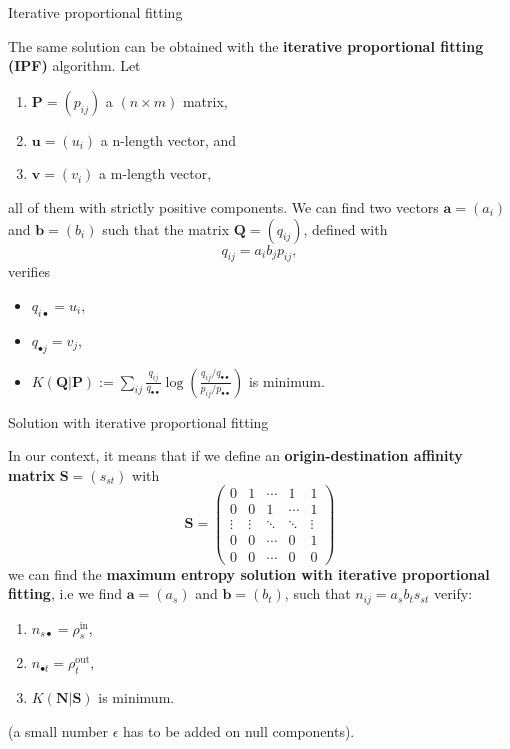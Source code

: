 \documentclass[10pt]{beamer}
\newcommand{\imp}[1]{\textbf{\color{cyan}#1}}
\begin{document}
	
	\begin{frame}{Iterative proportional fitting}
	
	The same solution can be obtained with the \imp{iterative proportional fitting (IPF)} algorithm. Let 
	\begin{enumerate}
		\item $\mathbf{P} = (p_{ij})$ a $(n \times m)$ matrix, 
		\item $\mathbf{u} = (u_i)$ a n-length vector, and 
		\item $\mathbf{v} = (v_i)$ a m-length vector,
	\end{enumerate}
	all of them with strictly positive components. We can find two vectors $\mathbf{a} = (a_i)$ and $\mathbf{b} = (b_i)$ such that the matrix $\mathbf{Q} = (q_{ij})$, defined with
	$$
		q_{ij} = a_i b_j p_{ij},
	$$
	verifies
	\begin{itemize}
		\item $q_{i\bullet} = u_i$,
		\item $q_{\bullet j} = v_j$,
		\item $K(\mathbf{Q}| \mathbf{P}) := \sum_{ij} \frac{q_{ij}}{q_{\bullet \bullet}} \log \left( \frac{q_{ij} / q_{\bullet \bullet}}{p_{ij} / p_{\bullet \bullet}} \right)$ is minimum.
	\end{itemize}
	\end{frame}
	
	
	\begin{frame}{Solution with iterative proportional fitting}
		
		In our context, it means that if we define an \imp{origin-destination affinity matrix} $\mathbf{S} = (s_{st})$ with 
			$$
				\mathbf{S} = \left( \begin{array}{ccccc}
				0 & 1 & \cdots & 1 & 1 \\
				0 & 0 & 1 & \cdots & 1 \\
				\vdots & \vdots & \ddots & \ddots & \vdots \\
				0 & 0 & \cdots & 0 & 1 \\
				0 & 0 & \cdots & 0 & 0 
				\end{array} \right)
			$$
		we can find the \imp{maximum entropy solution with iterative proportional fitting}, i.e we find $\mathbf{a} = (a_s)$ and $\mathbf{b} = (b_t)$, such that $n_{ij} = a_s b_t s_{st}$ verify:
		\begin{enumerate}
			\item $n_{s\bullet} = \rho^\text{in}_s$,
			\item $n_{\bullet t} = \rho^\text{out}_t$,
			\item $K(\mathbf{N}| \mathbf{S})$ is minimum.
		\end{enumerate}
		\small (a small number $\epsilon$ has to be added on null components).
	\end{frame}
	
\end{document}
